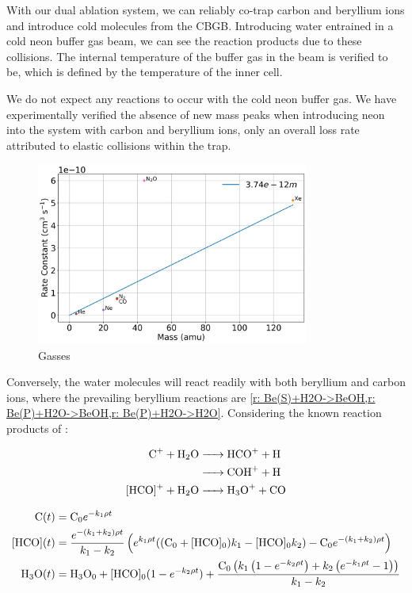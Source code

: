 With our dual ablation system, we can reliably co-trap carbon and beryllium ions and introduce cold molecules from the CBGB. Introducing water entrained in a cold neon buffer gas beam, we can see the reaction products due to these collisions. The internal temperature of the buffer gas in the beam is verified to be, which is defined by the temperature of the inner cell.

We do not expect any reactions to occur with the cold neon buffer gas. We have experimentally verified the absence of new mass peaks when introducing neon into the system with carbon and beryllium ions, only an overall loss rate attributed to elastic collisions within the trap. 

\begin{figure}[H]
	\centering
	\includegraphics[width=0.8\textwidth]{images/Be_noble_gasses.png}
	\caption{Gasses}
	\label{fig: Be noble gasses}
\end{figure}

Conversely, the water molecules will react readily with both beryllium and carbon ions, where the prevailing beryllium reactions are \cref{r: Be(S)+H2O->BeOH,r: Be(P)+H2O->BeOH,r: Be(P)+H2O->H2O}. Considering the known reaction products of :

\begin{align}
	\ce{C+ + H2O & -> HCO+ + H} \label{r: C+H2O->HCO} \\
	\ce{& -> COH+ + H} \label{r: C+H2O->COH} \\
	\ce{[HCO]+ + H2O & -> H3O+ + CO} \label{r: [HCO]+H2O->H3O}
\end{align}

\begin{align}
	\ce{C}(t) & = \ce{C0} e^{-k_1 \rho t} \label{eq: C(t)+H2O} \\
	\ce{[HCO]}(t) & = \frac{e^{-(k_1 + k_2) \rho t}}{k_1 - k_2} \left(e^{k_1 \rho t}((\ce{C0} + \ce{[HCO]0})k_1 - \ce{[HCO]0} k_2) - \ce{C0} e^{-(k_1 + k_2) \rho t}\right) \label{eq: C+H2O->[HCO](t)} \\
	\ce{H3O}(t) & = \ce{H3O0} + \ce{[HCO]0} (1 - e^{-k_2 \rho t}) + \frac{\ce{C0}\left( k_1 \left(1 - e^{-k_2 \rho t}\right) + k_2 \left(e^{-k_1 \rho t} - 1\right) \right)}{k_1 - k_2} \label{eq: [HCO]+H2O->H3O(t)}
\end{align}

